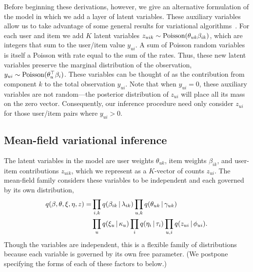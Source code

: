 
Before beginning these derivations, however, we give an alternative
formulation of the model in which we add a layer of latent variables.
These auxiliary variables allow us to take advantage of some general
results for variational
algorithms~\cite{Ghahramani:2001,Hoffman:2013}.  For each user and
item we add $K$ latent variables $z_{uik} \sim \textrm{Poisson}(\theta_{uk}
\beta_{ik})$, which are integers that sum to the user/item value
$y_{ui}$.  A sum of Poisson random variables is itself a Poisson with
rate equal to the sum of the rates.  Thus, these new latent variables
preserve the marginal distribution of the observation, $y_{ui} \sim
\textrm{Poisson}(\theta_{u}^\top \beta_{i})$.  These variables can be thought
of as the contribution from component $k$ to the total observation
$y_{ui}$.  Note that when $y_{ui} = 0$, these auxiliary variables are
not random---the posterior distribution of $z_{ui}$ will place all its
mass on the zero vector.  Consequently, our inference procedure need
only consider $z_{ui}$ for those user/item pairs where $y_{ui} > 0$.

\subsection{Mean-field variational inference} The latent variables in
the model are user weights $\theta_{uk}$, item weights $\beta_{ik}$,
and user-item contributions $z_{uik}$, which we represent as a
$K$-vector of counts $z_{ui}$.  The mean-field family considers these
variables to be independent and each governed by its own distribution,
\begin{align}
  \label{eq:q}
  q(\beta, \theta, \xi, \eta, z) =& \prod_{i,k} q(\beta_{ik} \,\vert\, \lambda_{ik})
  \prod_{u,k} q(\theta_{uk} \,\vert\, \gamma_{uk}) \nonumber\\ 
  & \prod_{u} q(\xi_u \,\vert\, \kappa_u) \prod_{i} q(\eta_i \,\vert\, \tau_i)
  \prod_{u,i} q(z_{ui} \,\vert\, \phi_{ui}).
\end{align}
Though the variables are independent, this is a flexible family of
distributions because each variable is governed by its own free
parameter.  (We postpone specifying the forms of each of these factors
to below.)

